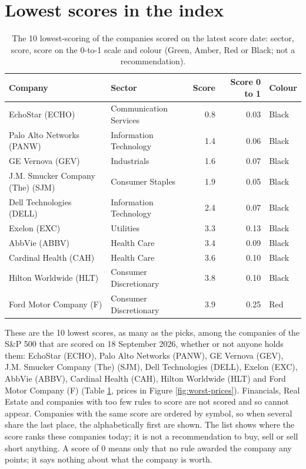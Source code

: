 \documentclass[11pt,a4paper]{article}
\begin{document}
\section{Lowest scores in the index}
\label{sec:worst}
\begin{table}[H]
\centering
\small
\caption{The 10 lowest-scoring of the companies scored on the latest score date: sector, score, score on the 0-to-1 scale and colour (Green, Amber, Red or Black; not a recommendation).}\label{tab:worst}
\begin{tabular}{p{4.4cm} p{3cm} r r p{3cm}}
\hline
Company & Sector & Score & Score 0 to 1 & Colour \\
\hline
EchoStar (ECHO) & Communication Services & 0.8 & 0.03 & \cellcolor[HTML]{BFBFBF}Black \\
Palo Alto Networks (PANW) & Information Technology & 1.4 & 0.06 & \cellcolor[HTML]{BFBFBF}Black \\
GE Vernova (GEV) & Industrials & 1.6 & 0.07 & \cellcolor[HTML]{BFBFBF}Black \\
J.M. Smucker Company (The) (SJM) & Consumer Staples & 1.9 & 0.05 & \cellcolor[HTML]{BFBFBF}Black \\
Dell Technologies (DELL) & Information Technology & 2.4 & 0.07 & \cellcolor[HTML]{BFBFBF}Black \\
Exelon (EXC) & Utilities & 3.3 & 0.13 & \cellcolor[HTML]{BFBFBF}Black \\
AbbVie (ABBV) & Health Care & 3.4 & 0.09 & \cellcolor[HTML]{BFBFBF}Black \\
Cardinal Health (CAH) & Health Care & 3.6 & 0.10 & \cellcolor[HTML]{BFBFBF}Black \\
Hilton Worldwide (HLT) & Consumer Discretionary & 3.8 & 0.10 & \cellcolor[HTML]{BFBFBF}Black \\
Ford Motor Company (F) & Consumer Discretionary & 3.9 & 0.25 & \cellcolor[HTML]{F4B6B6}Red \\
\hline
\end{tabular}
\end{table}
These are the 10 lowest scores, as many as the picks, among the companies of the S\&P 500 that are scored on 18 September 2026, whether or not anyone holds them: EchoStar (ECHO), Palo Alto Networks (PANW), GE Vernova (GEV), J.M. Smucker Company (The) (SJM), Dell Technologies (DELL), Exelon (EXC), AbbVie (ABBV), Cardinal Health (CAH), Hilton Worldwide (HLT) and Ford Motor Company (F) (Table \ref{tab:worst}, prices in Figure \ref{fig:worst-prices}). Financials, Real Estate and companies with too few rules to score are not scored and so cannot appear. Companies with the same score are ordered by symbol, so when several share the last place, the alphabetically first are shown. The list shows where the score ranks these companies today; it is not a recommendation to buy, sell or sell short anything. A score of 0 means only that no rule awarded the company any points; it says nothing about what the company is worth.
\end{document}
